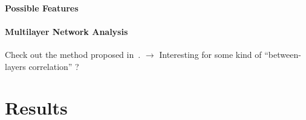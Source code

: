 \paragraph{Possible Features}






\paragraph{Multilayer Network Analysis}
Check out the method proposed in~\cite{iacovacci2015mesoscopic}. $\rightarrow$ Interesting for some kind of ``between-layers correlation'' ?








\section{Results}

















